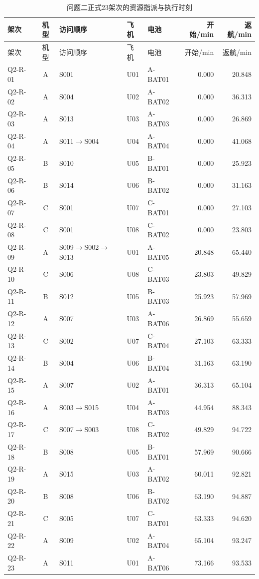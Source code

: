 \begin{longtable}{@{}lclllrr@{}}
\caption{问题二正式23架次的资源指派与执行时刻}\label{tab:q2_schedule}\\
\toprule
架次 & 机型 & 访问顺序 & 飞机 & 电池 & 开始/min & 返航/min\\
\midrule
\endfirsthead
\toprule
架次 & 机型 & 访问顺序 & 飞机 & 电池 & 开始/min & 返航/min\\
\midrule
\endhead
Q2-R-01 & A & S001 & U01 & A-BAT01 & 0.000 & 20.848\\
Q2-R-02 & A & S004 & U02 & A-BAT02 & 0.000 & 36.313\\
Q2-R-03 & A & S013 & U03 & A-BAT03 & 0.000 & 26.869\\
Q2-R-04 & A & S011$\to$S004 & U04 & A-BAT04 & 0.000 & 41.068\\
Q2-R-05 & B & S010 & U05 & B-BAT01 & 0.000 & 25.923\\
Q2-R-06 & B & S014 & U06 & B-BAT02 & 0.000 & 31.163\\
Q2-R-07 & C & S001 & U07 & C-BAT01 & 0.000 & 27.103\\
Q2-R-08 & C & S001 & U08 & C-BAT02 & 0.000 & 23.803\\
Q2-R-09 & A & S009$\to$S002$\to$S013 & U01 & A-BAT05 & 20.848 & 65.440\\
Q2-R-10 & C & S006 & U08 & C-BAT03 & 23.803 & 49.829\\
Q2-R-11 & B & S012 & U05 & B-BAT03 & 25.923 & 57.969\\
Q2-R-12 & A & S007 & U03 & A-BAT06 & 26.869 & 55.659\\
Q2-R-13 & C & S002 & U07 & C-BAT04 & 27.103 & 63.333\\
Q2-R-14 & B & S004 & U06 & B-BAT04 & 31.163 & 63.190\\
Q2-R-15 & A & S007 & U02 & A-BAT01 & 36.313 & 65.104\\
Q2-R-16 & A & S003$\to$S015 & U04 & A-BAT03 & 44.954 & 88.343\\
Q2-R-17 & C & S007$\to$S003 & U08 & C-BAT02 & 49.829 & 94.722\\
Q2-R-18 & B & S008 & U05 & B-BAT01 & 57.969 & 90.666\\
Q2-R-19 & A & S015 & U03 & A-BAT02 & 60.011 & 92.821\\
Q2-R-20 & B & S008 & U06 & B-BAT02 & 63.190 & 94.887\\
Q2-R-21 & C & S005 & U07 & C-BAT01 & 63.333 & 94.620\\
Q2-R-22 & A & S009 & U02 & A-BAT04 & 65.104 & 93.247\\
Q2-R-23 & A & S011 & U01 & A-BAT06 & 73.166 & 93.533\\
\bottomrule
\end{longtable}
